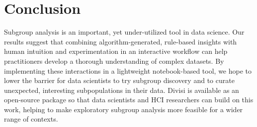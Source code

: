 \section{Conclusion}

Subgroup analysis is an important, yet under-utilized tool in data science.
Our results suggest that combining algorithm-generated, rule-based insights with human intuition and experimentation in an interactive workflow can help practitioners develop a thorough understanding of complex datasets.
By implementing these interactions in a lightweight notebook-based tool, we hope to lower the barrier for data scientists to try subgroup discovery and to curate unexpected, interesting subpopulations in their data.
Divisi is available as an open-source package so that data scientists and HCI researchers can build on this work, helping to make exploratory subgroup analysis more feasible for a wider range of contexts.